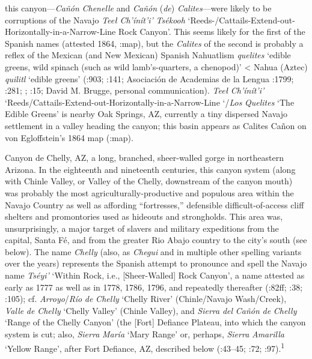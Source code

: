 this canyon—\textit{Cañón} \textit{Chenelle} and \textit{Cañón} (\textit{de}) \textit{Calites}—were likely to be corruptions of the Navajo \textit{Teeł} \textit{Ch'ínít'i'} \textit{Tsékooh} ‘Reeds-/Cattails-Extend-out-Horizontally-in-a-Narrow-Line Rock Canyon’.  This seems likely for the first of the Spanish names (attested 1864, \citealt{Madsen2010}:map), but the \textit{Calites} of the second is probably a reflex of the Mexican (and New Mexican) Spanish Nahuatlism \textit{quelites} ‘edible greens, wild spinach (such as wild lamb’s-quarters, a chenopod)’ < Nahua (Aztec) \textit{quilitl} ‘edible greens’ (\citealt{Santamaría1959}:903; \citealt{Cobos1983}:141; Asociación de Academias de la Lengua \citealt{Española2010}:1799;  \citealt{Julyan1998}:281; \citealt{Bye1981}; \citealt{BillsVigil2008}:15; David M. Brugge, personal communication).  \textit{Teeł} \textit{Ch'ínít'i'} ‘Reeds/Cattails-Extend-out-Horizontally-in-a-Narrow-Line ‘/\textit{Los} \textit{Quelites} ‘The Edible Greens’ is nearby Oak Springs, AZ, currently a tiny dispersed Navajo settlement in a valley heading the canyon; this basin appears as Calites Cañon on von Egloffstein’s 1864 map (\citealt{Madsen2010}:map).

Canyon de Chelly, AZ, a long, branched, sheer-walled gorge in northeastern Arizona.  In the eighteenth and nineteenth centuries, this canyon system (along with Chinle Valley, or Valley of the Chelly, downstream of the canyon mouth) was probably the most agriculturally-productive and populous area within the Navajo Country as well as affording “fortresses,” defensible difficult-of-access cliff shelters and promontories used as hideouts and strongholds.  This area was, unsurprisingly, a major target of slavers and military expeditions from the capital, Santa Fé, and from the greater Rio Abajo country to the city’s south (see below).  The name \textit{Chelly} (also, as \textit{Chegui} and in multiple other spelling variants over the years) represents the Spanish attempt to pronounce and spell the Navajo name \textit{Tséyi’} ‘Within Rock, i.e., [Sheer-Walled] Rock Canyon’, a name attested as early as 1777 as well as in 1778, 1786, 1796, and repeatedly thereafter (\citealt{Correll1979}:82ff; \citealt{Kessell2013}:38; \citealt{Reeve1971a}:105); cf. \textit{Arroyo}/\textit{Río} \textit{de} \textit{Chelly} ‘Chelly River’ (Chinle/Navajo Wash/Creek), \textit{Valle} \textit{de} \textit{Chelly} ‘Chelly Valley’ (Chinle Valley), and \textit{Sierra} \textit{del} \textit{Cañón} \textit{de} \textit{Chelly} ‘Range of the Chelly Canyon’ (the [Fort] Defiance Plateau, into which the canyon system is cut; also, \textit{Sierra} \textit{María} ‘Mary Range’ or, perhaps, \textit{Sierra} \textit{Amarilla} ‘Yellow Range’, after Fort Defiance, AZ, described below (\citealt{Jett2001}:43–45; \citealt{Rice1970}:72; \citealt{Eidenbach2012}:97).\textsuperscript{1}  

